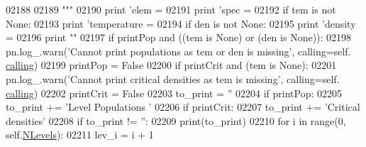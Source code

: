 \begin{DoxyCode}
02188 \textcolor{stringliteral}{}
02189 \textcolor{stringliteral}{        """}
02190         \textcolor{keywordflow}{print} \textcolor{stringliteral}{'elem = %
02191         \textcolor{keywordflow}{print} \textcolor{stringliteral}{'spec = %
02192         \textcolor{keywordflow}{if} tem \textcolor{keywordflow}{is} \textcolor{keywordflow}{not} \textcolor{keywordtype}{None}:
02193             \textcolor{keywordflow}{print} \textcolor{stringliteral}{'temperature = %
02194         \textcolor{keywordflow}{if} den \textcolor{keywordflow}{is} \textcolor{keywordflow}{not} \textcolor{keywordtype}{None}:
02195             \textcolor{keywordflow}{print} \textcolor{stringliteral}{'density = %
02196         \textcolor{keywordflow}{print} \textcolor{stringliteral}{""}
02197         \textcolor{keywordflow}{if} printPop \textcolor{keywordflow}{and} ((tem \textcolor{keywordflow}{is} \textcolor{keywordtype}{None}) \textcolor{keywordflow}{or} (den \textcolor{keywordflow}{is} \textcolor{keywordtype}{None})):
02198             pn.log\_.warn(\textcolor{stringliteral}{'Cannot print populations as tem or den is missing'}, calling=self.
      \hyperlink{classpyneb_1_1core_1_1pynebcore_1_1_atom_a373b7735acf4f528b54bddf373ad67a1}{calling})
02199             printPop = \textcolor{keyword}{False}
02200         \textcolor{keywordflow}{if} printCrit \textcolor{keywordflow}{and} (tem \textcolor{keywordflow}{is} \textcolor{keywordtype}{None}):
02201             pn.log\_.warn(\textcolor{stringliteral}{'Cannot print critical densities as tem is missing'}, calling=self.
      \hyperlink{classpyneb_1_1core_1_1pynebcore_1_1_atom_a373b7735acf4f528b54bddf373ad67a1}{calling})
02202             printCrit = \textcolor{keyword}{False}
02203         to\_print = \textcolor{stringliteral}{''}
02204         \textcolor{keywordflow}{if} printPop:
02205             to\_print += \textcolor{stringliteral}{'Level   Populations  '}
02206         \textcolor{keywordflow}{if} printCrit:
02207             to\_print += \textcolor{stringliteral}{'Critical densities'}
02208         \textcolor{keywordflow}{if} to\_print != \textcolor{stringliteral}{''}:
02209             print(to\_print)
02210         \textcolor{keywordflow}{for} i \textcolor{keywordflow}{in} range(0, self.\hyperlink{classpyneb_1_1core_1_1pynebcore_1_1_atom_a6b43c1e6431a6786c1b4267f704fb4e8}{NLevels}):
02211             lev\_i = i + 1
}}}}
\end{DoxyCode}

